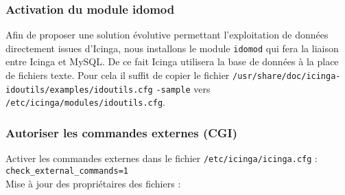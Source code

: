 		\subsubsection{Activation du module idomod}
			\vspace{0.3cm}

			Afin de proposer une solution évolutive permettant l'exploitation de données directement issues d'Icinga, nous installons le module \verb?idomod? qui fera la liaison entre Icinga et MySQL. De ce fait Icinga utilisera la base de données à la place de fichiers texte. Pour cela il suffit de copier le fichier \verb?/usr/share/doc/icinga-idoutils/examples/idoutils.cfg? \verb?-sample? vers \verb?/etc/icinga/modules/idoutils.cfg?.\\

		\subsubsection{Autoriser les commandes externes (CGI)}
			\vspace{0.3cm}
			
			Activer les commandes externes dans le fichier \verb?/etc/icinga/icinga.cfg? : \\
			\verb?check_external_commands=1? \\
			
			Mise à jour des propriétaires des fichiers :\\
			
			\\
			
